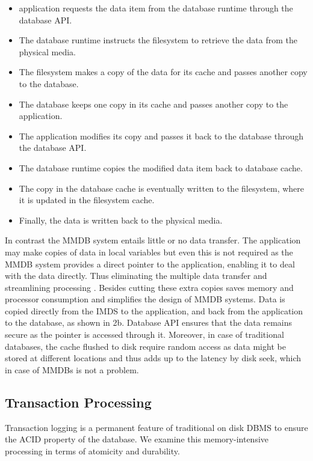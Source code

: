 \documentclass[12pt]{article} %
\begin{document}
\begin{itemize}
\item application requests the data item from the database runtime through the database API.

\item The database runtime instructs the filesystem to retrieve the data from the physical media.

\item The filesystem makes a copy of the data for its cache and passes another copy to the database.

\item The database keeps one copy in its cache and passes another copy to the application.

\item The application modifies its copy and passes it back to the database through the database API.

\item The database runtime copies the modified data item back to database cache.

\item The copy in the database cache is eventually written to the filesystem, where it is updated in the filesystem cache.

\item Finally, the data is written back to the physical media.
\end{itemize}

In contrast the MMDB system entails little or no data transfer. The application may make copies of data in local variables but even this is not required as the MMDB system provides a direct pointer to the application, enabling it to deal with the data directly. Thus eliminating the multiple data transfer and streamlining processing . Besides cutting these extra copies saves memory and processor consumption and simplifies the design of MMDB systems. Data is copied directly from the IMDS to the application, and back from the application to the database, as shown in \figurename{2b}. Database API ensures that the data remains secure as the pointer is accessed through it. Moreover, in case of traditional databases, the cache flushed to disk require random access as data might be stored at different locations and thus adds up to the latency by disk seek, which in case of MMDBs is not a problem.
 
\subsection{Transaction Processing}
Transaction logging is a permanent feature of traditional on disk DBMS to ensure the ACID property of the database. We examine this memory-intensive processing in terms of atomicity and durability. 
\end{document}

